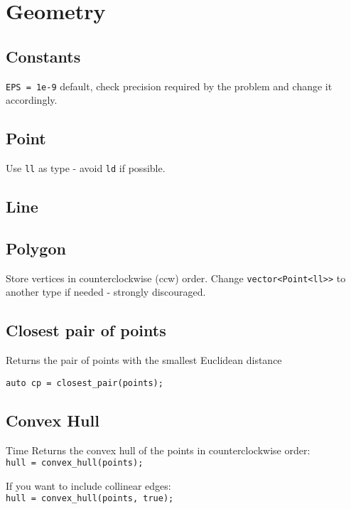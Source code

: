 \section{Geometry}

\subsection{Constants}
\verb|EPS = 1e-9| default, check precision required by the problem and
change it accordingly.


\subsection{Point}
Use \verb|ll| as type - avoid \verb|ld| if possible.

\subsection{Line}

\subsection{Polygon}
Store vertices in counterclockwise (ccw) order.
Change \verb|vector<Point<ll>>| to another type if needed - strongly discouraged.

\subsection{Closest pair of points}

Returns the pair of points with the smallest Euclidean distance

\verb|auto cp = closest_pair(points);|


\subsection{Convex Hull}
 Time
Returns the convex hull of the points in counterclockwise order: \\
\verb|hull = convex_hull(points);|

If you want to include collinear edges: \\
\verb|hull = convex_hull(points, true);|

